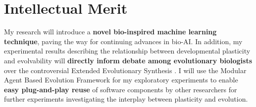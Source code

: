 \section{Intellectual Merit}
My research will introduce a \textbf{novel bio-inspired machine learning technique}, paving the way for continuing advances in bio-AI.
In addition, my experimental results describing the relationship between developmental plasticity and evolvability will \textbf{directly inform debate among evolutionary biologists} over the controversial Extended Evolutionary Synthesis \cite{Laland2014DoesRethink}.
I will use the Modular Agent Based Evolution Framework \cite{Hintze2017Mabe} for my exploratory experiments to enable \textbf{easy plug-and-play reuse} of software components by other researchers for further experiments investigating the interplay between plasticity and evolution.

